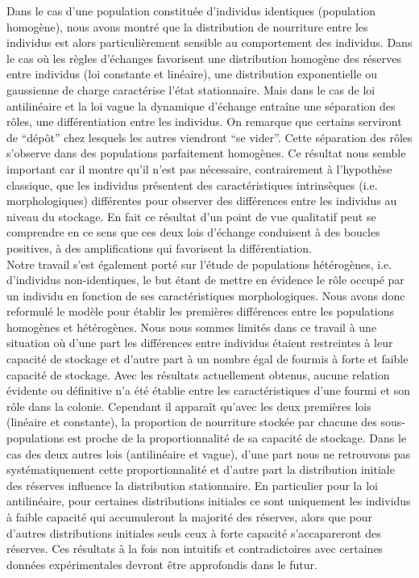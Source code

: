 Dans le cas d'une population constituée d'individus identiques (population homogène), nous avons montré que la distribution de nourriture entre les individus est alors particulièrement sensible au comportement des individus.  Dans le cas où les règles d'échanges favorisent une distribution homogène des réserves entre individus (loi constante et linéaire), une distribution exponentielle ou gaussienne de charge caractérise l'état stationnaire. Mais dans le cas de loi antilinéaire et la loi vague la dynamique d'échange entraîne une séparation des rôles, une différentiation  entre les individus. On remarque que certains serviront de ``dépôt'' chez lesquels les autres viendront ``se vider''. Cette séparation des rôles s'observe dans des populations parfaitement homogènes. Ce résultat nous semble important car il montre qu'il n'est pas nécessaire, contrairement à l'hypothèse classique, que les individus présentent des caractéristiques intrinsèques (i.e. morphologiques) différentes pour observer des différences entre les individus au niveau du stockage. En fait ce résultat d'un point de vue qualitatif peut se comprendre en ce sens que ces deux lois d'échange conduisent à des boucles positives, à des amplifications qui favorisent la différentiation.\\

Notre travail s'est également porté sur l'étude de populations hétérogènes, i.e. d'individus non-identiques, le but étant de mettre en évidence le rôle occupé par un individu en fonction de ses caractéristiques morphologiques. Nous avons donc reformulé le modèle pour établir les premières différences entre les populations homogènes et hétérogènes. Nous nous sommes limités dans ce travail à une situation où d'une part les différences entre individus étaient restreintes à leur capacité de stockage et d'autre part à un nombre égal de fourmis à forte et faible capacité de stockage. Avec les résultats actuellement obtenus, aucune relation évidente ou définitive n'a été établie entre les caractéristiques d'une fourmi et son rôle dans la colonie. Cependant il apparaît qu'avec les deux premières lois (linéaire et constante), la proportion de nourriture stockée par chacune des sous-populations est proche de la proportionnalité de sa capacité de stockage. Dans le cas des deux autres lois (antilinéaire et vague), d'une part nous ne retrouvons pas systématiquement cette proportionnalité et d'autre part la distribution initiale des réserves influence la distribution stationnaire. En particulier pour la loi antilinéaire, pour certaines distributions initiales ce sont uniquement les individus à faible capacité qui accumuleront la majorité des réserves, alors que pour d'autres distributions initiales seuls ceux à forte capacité s'accapareront des réserves. Ces résultats à la fois non intuitifs et contradictoires avec certaines données expérimentales devront être approfondis dans le futur.\\


